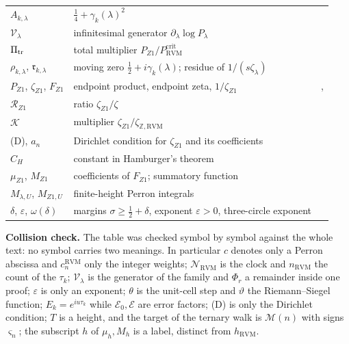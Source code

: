 \documentclass[11pt,reqno]{amsart}
\makeatletter
\let\CG@origeqref\eqref
\newcommand{\CG@gettip}[1]{\@ifundefined{CGTip@#1}{Reference: #1}{\csname CGTip@#1\endcsname}}
\DeclareRobustCommand{\CGeqref}[1]{\pdftooltip{\CG@origeqref{#1}}{\CG@gettip{#1}}}
\numberwithin{equation}{section}
\theoremstyle{plain}
\theoremstyle{definition}
\theoremstyle{remark}
\newcommand{\Z}{\mathbb Z}
\newcommand{\eps}{\varepsilon}
\newcommand{\RVM}{\mathrm{RVM}}
\newcommand{\crit}{\mathrm{crit}}
\newcommand{\NR}{\mathcal N_{\RVM}}
\makeatother
\begin{document}
{\begin{longtable}{>{\raggedright\arraybackslash}p{}>{\raggedright\arraybackslash}p{}>{\raggedright\arraybackslash}p{}}
$A_{k,\lambda}$ & $\tfrac14+\gamma_k(\lambda)^2$ & \CGeqref{eq:generator}\\
$\mathcal V_\lambda$ & infinitesimal generator $\partial_\lambda\log P_\lambda$ & \CGeqref{eq:generator}\\
$\Pi_{\rm tr}$ & total multiplier $P_{Z1}/P_{\RVM}^{\crit}$ & \CGeqref{eq:transport-multiplier}\\
$\rho_{k,\lambda}$, $\mathfrak r_{k,\lambda}$ & moving zero $\tfrac12+i\gamma_k(\lambda)$; residue of $1/(s\zeta_\lambda)$ & \CGeqref{eq:residue-transport}\\
$P_{Z1}$, $\zeta_{Z1}$, $F_{Z1}$ & endpoint product, endpoint zeta, $1/\zeta_{Z1}$ & \CGeqref{eq:Z1-product}, \CGeqref{eq:FZ1}\\
$\mathscr R_{Z1}$ & ratio $\zeta_{Z1}/\zeta$ & \CGeqref{eq:Z1-defect-ratio}\\
$\mathcal K$ & multiplier $\zeta_{Z1}/\zeta_{\Z,\RVM}$ & \CGeqref{eq:K-multiplier}\\
(D), $a_n$ & Dirichlet condition for $\zeta_{Z1}$ and its coefficients & \CGeqref{eq:Z1-D}\\
$C_H$ & constant in Hamburger's theorem & \CGeqref{eq:Hamburger-conclusion}\\
$\mu_{Z1}$, $M_{Z1}$ & coefficients of $F_{Z1}$; summatory function & \CGeqref{eq:Z1-reciprocal-Dirichlet}\\
$M_{\lambda,U}$, $M_{Z1,U}$ & finite-height Perron integrals & \CGeqref{eq:truncated-Perron}\\
$\delta$, $\eps$, $\omega(\delta)$ & margins $\sigma\ge\tfrac12+\delta$, exponent $\eps>0$, three-circle exponent & \CGeqref{eq:three-circles-exponent}\\
\end{longtable}
}

\medskip\noindent\textbf{Collision check.}
The table was checked symbol by symbol against the whole text: no symbol carries two meanings.  In particular $c$ denotes only a Perron abscissa and $c_n^{\RVM}$ only the integer weights; $\NR$ is the clock and $n_{\RVM}$ the count of the $\tau_k$; $\mathcal V_\lambda$ is the generator of the family and $\Phi_r$ a remainder inside one proof; $\eps$ is only an exponent; $\theta$ is the unit-cell step and $\vartheta$ the Riemann--Siegel function; $E_k=e^{iu\tau_k}$ while $\mathcal E_0,\mathcal E$ are error factors; (D) is only the Dirichlet condition; $T$ is a height, and the target of the ternary walk is $\mathcal M(n)$ with signs $\varsigma_n$; the subscript $h$ of $\mu_h,M_h$ is a label, distinct from $h_{\RVM}$.
\end{document}
